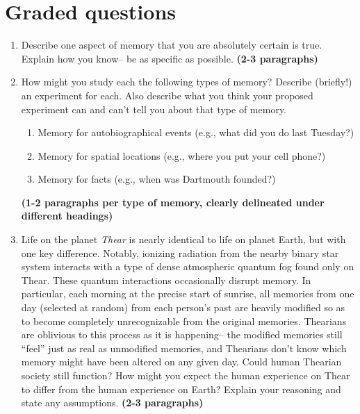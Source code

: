 \documentclass[11pt]{article}
\begin{document}
\section*{Graded questions}
\begin{enumerate}

\item Describe one aspect of memory that you are absolutely certain is
  true.  Explain how you know-- be as specific as possible.
  \textbf{(2-3 paragraphs)}

\item How might you study each the following types of
  memory?  Describe (briefly!) an experiment for each.  Also describe
  what you think your proposed experiment can and can't tell you about that
  type of memory.
  \begin{enumerate}
  \item Memory for autobiographical events (e.g., what did you do last Tuesday?)
    \item Memory for spatial locations (e.g., where you put your cell
      phone?)
      \item Memory for facts (e.g., when was Dartmouth founded?)
      \end{enumerate}
\textbf{(1-2 paragraphs per type of memory, clearly delineated under
  different headings)}

\item Life on the planet \textit{Thear} is nearly identical to life on
  planet Earth, but with one key difference.  Notably, ionizing
  radiation from the nearby binary star system interacts with a type
  of dense atmospheric quantum fog found only on Thear.  These quantum
  interactions occasionally disrupt memory.  In particular, each
  morning at the precise start of sunrise, all memories from one day
  (selected at random) from each person's past are heavily modified so
  as to become completely unrecognizable from the original memories.
  Thearians are oblivious to this process as it is happening-- the
  modified memories still ``feel'' just as real as unmodified
  memories, and Thearians don't know which memory might have been
  altered on any given day.  Could human Thearian society still
  function?  How might you expect the human experience on Thear to
  differ from the human experience on Earth?  Explain your reasoning
  and state any assumptions.  \textbf{(2-3 paragraphs)}
\end{enumerate}
\end{document}
